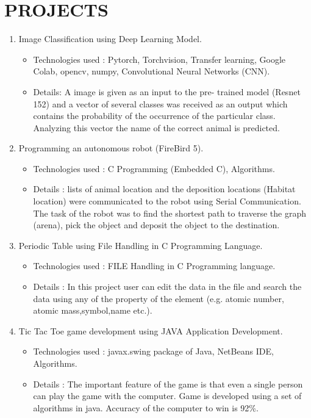 \documentclass[11pt,a4paper,sans]{moderncv}
\begin{document}
\section{PROJECTS}
\begin{enumerate}
	\item Image Classification using Deep Learning Model.
		\begin{itemize}
			\item Technologies used : Pytorch, Torchvision, Transfer learning, Google Colab, opencv, numpy, Convolutional Neural Networks (CNN).
			\item  Details: A image is given as an input to the pre- trained model (Resnet 152) and a vector of several classes was received as an output which contains the probability of the occurrence of the particular class. Analyzing this vector the name of the correct animal is predicted.
		\end{itemize}

	\item Programming an autonomous robot (FireBird 5).
		\begin{itemize}
			\item Technologies used : C Programming (Embedded C), Algorithms.
			\item Details : lists of animal location and the deposition locations (Habitat location) were communicated to the robot using Serial Communication. The task of the robot was to find the shortest path to traverse the graph (arena), pick the object and deposit the object to the destination.
		\end{itemize}
	\item Periodic Table using File Handling in C Programming Language.
		\begin{itemize}
			\item Technologies used : FILE Handling in C
Programming language.
			\item Details : In this project user can edit the data in the file and search the data using any of the property of the element (e.g. atomic number, atomic mass,symbol,name etc.).
		\end{itemize}
	\item Tic Tac Toe game development using JAVA Application Development.
		\begin{itemize}
			\item Technologies used : javax.swing package of Java, NetBeans IDE, Algorithms.
			\item Details : The important feature of the game is that even a single person can play the game with the computer.
Game is developed using a set of algorithms in java. Accuracy of the computer to win is 92\%.
		\end{itemize}

\end{enumerate}
\end{document}

